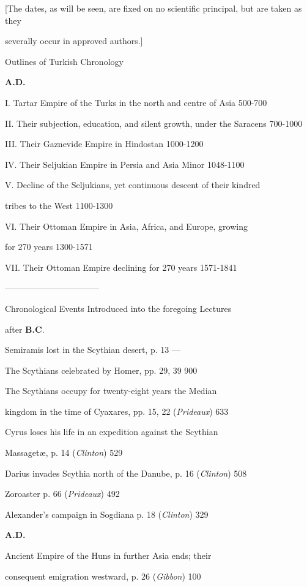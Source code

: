 
[The dates, as will be seen, are fixed on
no scientific principal, but are taken as they

severally occur in
approved authors.]

Outlines of Turkish
Chronology

\textbf{A.D.}

I.
Tartar Empire of the Turks in the north and
centre of Asia
500-700

II.
Their subjection, education, and silent growth,
under the Saracens
700-1000

III.
Their Gaznevide Empire in Hindostan
1000-1200

IV.
Their Seljukian Empire in Persia and Asia
Minor
1048-1100

V.
Decline of the Seljukians, yet continuous descent
of their kindred

tribes to the West
1100-1300

VI.
Their Ottoman Empire in Asia, Africa, and Europe,
growing 

for 270 years
1300-1571

VII.
Their Ottoman Empire declining for 270
years
1571-1841

———————————

Chronological Events Introduced
into the foregoing Lectures

after
\textbf{B.C}.

Semiramis lost in the Scythian desert, p. 13
—

The Scythians celebrated by Homer, pp. 29, 39
900

The Scythians occupy for twenty-eight years the
Median

kingdom in the time of Cyaxares, pp. 15, 22
(\emph{Prideaux})
633

Cyrus loses his life in an expedition against
the Scythian

Massagetæ, p. 14 (\emph{Clinton})
529

Darius invades Scythia north of the Danube, p.
16 (\emph{Clinton})
508

Zoroaster p. 66 (\emph{Prideaux})
492

Alexander's campaign in Sogdiana p. 18 (\emph{Clinton})
329

\textbf{A.D.}

Ancient Empire of the Huns in further Asia
ends; their

consequent emigration westward, p. 26 (\emph{Gibbon})
100


